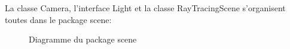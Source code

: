 \documentclass[../../Rapport RayTracer]{subfiles}
\begin{document}
La classe Camera, l'interface Light et la classe RayTracingScene s'organisent toutes dans le package scene:

\begin{figure}[h!]
	
	\caption{Diagramme du package scene}
	\label{diagrammePackageScene}
\end{figure}
\FloatBarrier
\end{document}
